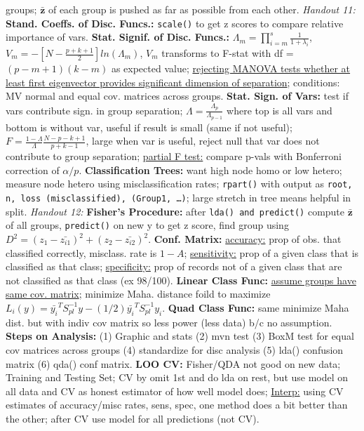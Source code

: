 \documentclass[9pt]{extarticle}
\begin{document}
groups; $\boldsymbol{\bar{z}}$ of each group is pushed as far as possible from 
each other.
\textit{Handout 11:}
\textbf{Stand. Coeffs. of Disc. Funcs.:} \texttt{scale()} to get z scores to 
compare relative importance of vars.
\textbf{Stat. Signif. of Disc. Funcs.:} $\Lambda_m = \prod_{i=m}^s \frac{
1}{1 + \lambda_i}$, $V_m = -[N - \frac{p + k + 1}{2}]ln(\Lambda_m)$, $V_m$ 
transforms to F-stat with df = $(p-m+1)(k-m)$ as expected value; \underline{
rejecting MANOVA tests whether at least first eigenvector provides significant
dimension of separation}; conditions: MV normal and equal cov. matrices across 
groups.
\textbf{Stat. Sign. of Vars:} test if vars contribute sign. in group separation; 
$\Lambda = \frac{\Lambda_p}{\Lambda_{p-1}}$ where top is all vars and bottom is 
without var, useful if result is small (same if not useful); $F = \frac{1 - 
\Lambda}{\Lambda} \frac{N - p - k + 1}{p + k - 1}$, large when var is useful, 
reject null that var does not contribute to group separation; \underline{partial 
F test:} compare p-vals with Bonferroni correction of $\alpha / p$.
\textbf{Classification Trees:} want high node homo or low hetero; measure 
node hetero using misclassification rates; \texttt{rpart()} with output as 
\texttt{root, n, loss (misclassified), (Group1, \dots)}; large stretch in tree 
means helpful in split.
\textit{Handout 12:}
\textbf{Fisher's Procedure:} after \texttt{lda() and predict()} compute 
$\boldsymbol{\bar{z}}$ of all groups, \texttt{predict()} on new y to get z score, 
find group using $D^2 = (z_1 - \bar{z_{i1}})^2 + (z_2 - \bar{z_{i2}})^2$.
\textbf{Conf. Matrix:} \underline{accuracy:} prop of obs. that classified 
correctly, misclass. rate is $1-A$; \underline{sensitivity:} prop of a given 
class that is classified as that class; \underline{specificity:} prop of records 
not of a given class that are not classified as that class (ex 98/100).
\textbf{Linear Class Func:} \underline{assume groups have same cov. matrix};
minimize Maha. distance foild to maximize $L_i(y) = \bar{y_i}^TS_{pl}^{-1}y - (1/2)
\bar{y_i}^TS_{pl}^{-1}y_i$.
\textbf{Quad Class Func:} same minimize Maha dist. but with indiv cov matrix 
so less power (less data) b/c no assumption.
\textbf{Steps on Analysis:} (1) Graphic and stats (2) mvn test (3) BoxM test
for equal cov matrices across groups (4) standardize for disc analysis (5)
lda() confusion matrix (6) qda() conf matrix.
\textbf{LOO CV:} Fisher/QDA not good on new data; Training and Testing Set; 
CV by omit 1st and do lda on rest, but use model on all data and CV as honest 
estimator of how well model does; \underline{Interp:} using CV estimates of 
accuracy/misc rates, sens, spec, one method does a bit better than the other; 
after CV use model for all predictions (not CV).
\end{document}

